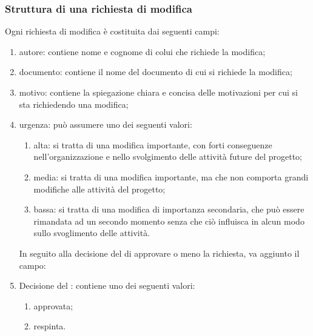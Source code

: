 		\subsubsection{Struttura di una richiesta di modifica}
			Ogni richiesta di modifica è costituita dai seguenti campi:
			\begin{enumerate}
				\item autore: contiene nome e cognome di colui che richiede la modifica;
				\item documento: contiene il nome del documento di cui si richiede la modifica;
				\item motivo: contiene la spiegazione chiara e concisa delle motivazioni per cui si sta richiedendo una modifica;
				\item urgenza: può assumere uno dei seguenti valori:
					\begin{enumerate}
						\item alta: si tratta di una modifica importante, con forti conseguenze nell'organizzazione e nello svolgimento delle attività future del progetto;
						\item media: si tratta di una modifica importante, ma che non comporta grandi modifiche alle attività del progetto;
						\item bassa: si tratta di una modifica di importanza secondaria, che può essere rimandata ad un secondo momento senza che ciò influisca in alcun modo sullo svoglimento delle attività.
					\end{enumerate}
			In seguito alla decisione del  di approvare o meno la richiesta, va aggiunto il campo:
				\item Decisione del : contiene uno dei seguenti valori:
					\begin{enumerate}
						\item approvata;
						\item respinta.
					\end{enumerate}
			\end{enumerate}
	
